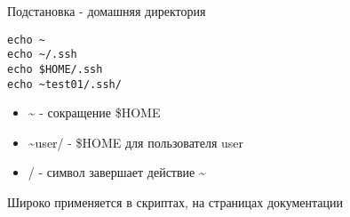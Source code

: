 \begin{frame}[fragile]{Подстановка - домашняя директория}

\begin{lstlisting}
echo ~
echo ~/.ssh
echo $HOME/.ssh
echo ~test01/.ssh/
\end{lstlisting}

\pause
\begin{itemize}
    \item \textasciitilde{} - сокращение \$HOME 
    \item \textasciitilde{}user/ - \$HOME для пользователя user
    \item / - символ завершает действие \textasciitilde{} 
\end{itemize}

Широко применяется в скриптах, на страницах документации
    
\end{frame}
